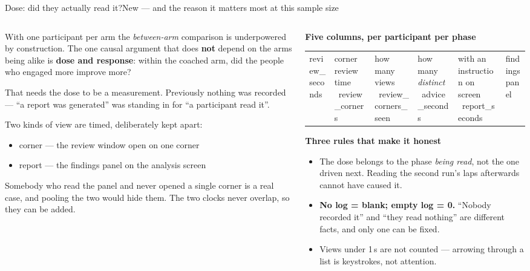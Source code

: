 \documentclass[aspectratio=169,10pt]{beamer}
\newcommand{\kw}[1]{\textcolor{cblue}{\textbf{#1}}}
\newcommand{\code}[1]{{\ttfamily\small #1}}
\begin{document}
\begin{frame}{Dose: did they actually read it?}{New --- and the reason it matters most at this sample size}
  \begin{columns}[T]
  \begin{column}{0.53\textwidth}\footnotesize
  With one participant per arm the \emph{between-arm} comparison is underpowered by
  construction. The one causal argument that does \kw{not} depend on the arms being
  alike is \kw{dose and response}: within the coached arm, did the people who
  engaged more improve more?

  \vspace{0.4em}
  That needs the dose to be a measurement. Previously nothing was recorded ---
  ``a report was generated'' was standing in for ``a participant read it''.

  \vspace{0.5em}
  Two kinds of view are timed, deliberately kept apart:
  \begin{itemize}\footnotesize
    \item \code{corner} --- the review window open on one corner
    \item \code{report} --- the findings panel on the analysis screen
  \end{itemize}
  Somebody who read the panel and never opened a single corner is a real case, and
  pooling the two would hide them. The two clocks never overlap, so they can be added.
  \end{column}
  \begin{column}{0.47\textwidth}
  \vspace{0.2em}\footnotesize
  \textbf{Five columns, per participant per phase}
  \begin{center}\scriptsize
  \begin{tabular}{@{}L{3.4cm}L{3.3cm}@{}}
    \toprule
    \code{review\_seconds} & corner review time \
    \code{review\_corners} & how many views \
    \code{review\_corners\_seen} & how many \emph{distinct} \
    \code{advice\_seconds} & with an instruction on screen \
    \code{report\_seconds} & findings panel \
    \bottomrule
  \end{tabular}
  \end{center}
  \vspace{0.3em}
  \textbf{Three rules that make it honest}
  \begin{itemize}\scriptsize
    \item The dose belongs to the phase \emph{being read}, not the one driven next.
      Reading the second run's laps afterwards cannot have caused it.
    \item \kw{No log = blank; empty log = 0.} ``Nobody recorded it'' and ``they read
      nothing'' are different facts, and only one can be fixed.
    \item Views under 1\,s are not counted --- arrowing through a list is keystrokes,
      not attention.
  \end{itemize}
  \end{column}
  \end{columns}
\end{frame}
\end{document}
